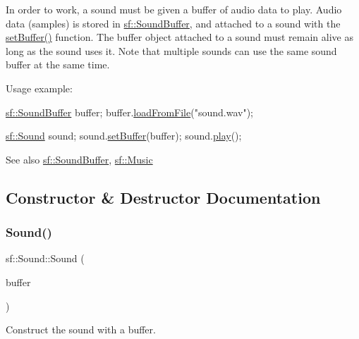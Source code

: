In order to work, a sound must be given a buffer of audio data to play. Audio data (samples) is stored in \hyperlink{classsf_1_1_sound_buffer}{sf\+::\+Sound\+Buffer}, and attached to a sound with the \hyperlink{classsf_1_1_sound_a8b395e9713d0efa48a18628c8ec1972e}{set\+Buffer()} function. The buffer object attached to a sound must remain alive as long as the sound uses it. Note that multiple sounds can use the same sound buffer at the same time.

Usage example\+: 
\begin{DoxyCode}
\hyperlink{classsf_1_1_sound_buffer}{sf::SoundBuffer} buffer;
buffer.\hyperlink{classsf_1_1_sound_buffer_a2be6a8025c97eb622a7dff6cf2594394}{loadFromFile}(\textcolor{stringliteral}{"sound.wav"});

\hyperlink{classsf_1_1_sound}{sf::Sound} sound;
sound.\hyperlink{classsf_1_1_sound_a8b395e9713d0efa48a18628c8ec1972e}{setBuffer}(buffer);
sound.\hyperlink{classsf_1_1_sound_a2953ffe632536e72e696fd880ced2532}{play}();
\end{DoxyCode}


\begin{DoxySeeAlso}{See also}
\hyperlink{classsf_1_1_sound_buffer}{sf\+::\+Sound\+Buffer}, \hyperlink{classsf_1_1_music}{sf\+::\+Music} 
\end{DoxySeeAlso}


\subsection{Constructor \& Destructor Documentation}
\mbox{\label{classsf_1_1_sound_a3b1cfc19a856d4ff8c079ee41bb78e69}} 
\subsubsection{\texorpdfstring{Sound()}{Sound()}\hspace{0.1cm}{\footnotesize\ttfamily [1/2]}}
{\footnotesize\ttfamily sf\+::\+Sound\+::\+Sound (\begin{DoxyParamCaption}\item[{const \hyperlink{classsf_1_1_sound_buffer}{Sound\+Buffer} \&}]{buffer }\end{DoxyParamCaption})\hspace{0.3cm}{\ttfamily [explicit]}}



Construct the sound with a buffer. 


